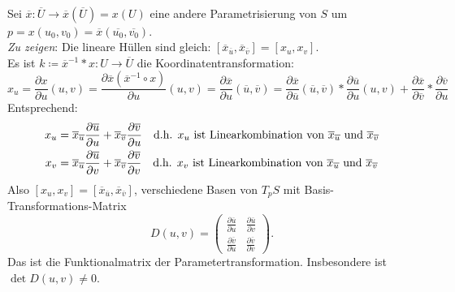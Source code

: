 \begin{remark}
  \  \\
  Sei \( \overline{x} : \overline{U} \to \overline{x}(\overline{U}) = x(U) \) eine andere Parametrisierung von \( S \) um \( p = x(u_0, v_0) = \overline{x}(\overline{u_0}, \overline{v_0}) \). \\
  \emph{Zu zeigen}: Die lineare Hüllen sind gleich: \( [\overline{x}_{\overline{u}}, \overline{x}_{\overline{v}}] = [x_u, x_v] \). \\
  Es ist \( k \coloneqq \overline{x}^{-1}*x : U \to \overline{U} \) die Koordinatentransformation:
  \begin{equation*}
    x_u = \frac{\partial x}{\partial u}(u,v) = \frac{\partial \overline{x}(\overline{x}^{-1} \circ x)}{\partial u}(u,v) = \frac{\partial \overline{x}}{\partial u}(\overline{u}, \overline{v}) = \frac{\partial \overline{x}}{\partial \overline{u}}(\overline{u},\overline{v}) *\frac{\partial \overline{u}}{\partial u}(u,v)+\frac{\partial \overline{x}}{\partial \overline{v}} * \frac{\partial \overline{v}}{\partial u}
  \end{equation*}
  Entsprechend:
  \begin{align*}
    x_u &= \overline{x}_{\overline{u}}\frac{\partial \overline{u}}{\partial u} + \overline{x}_{\overline{v}}\frac{\partial \overline{v}}{\partial u} \quad \text{d.h. \( x_u \) ist Linearkombination von \( \overline{x}_{\overline{u}} \) und \( \overline{x}_{\overline{v}} \)} \\
    x_v &= \overline{x}_{\overline{u}}\frac{\partial \overline{u}}{\partial v} + \overline{x}_{\overline{v}}\frac{\partial \overline{v}}{\partial v} \quad \text{d.h. \( x_v \) ist Linearkombination von \( \overline{x}_{\overline{u}} \) und \( \overline{x}_{\overline{v}} \)}
  \end{align*}
  Also \( [x_u, x_v] = [\overline{x}_{\overline{u}}, \overline{x}_{\overline{v}}] \), verschiedene Basen von \( T_p S \) mit Basis-Transformations-Matrix
  \begin{equation*}
    D(u,v) = \begin{pmatrix}
      \frac{\partial \overline{u}}{\partial u} & \frac{\partial \overline{u}}{\partial v} \\
      \frac{\partial \overline{v}}{\partial u} & \frac{\partial \overline{v}}{\partial v}
    \end{pmatrix}\text{.}
  \end{equation*}
  Das ist die Funktionalmatrix der Parametertransformation. Insbesondere ist \( \det D(u,v) \neq 0 \).
\end{remark}

